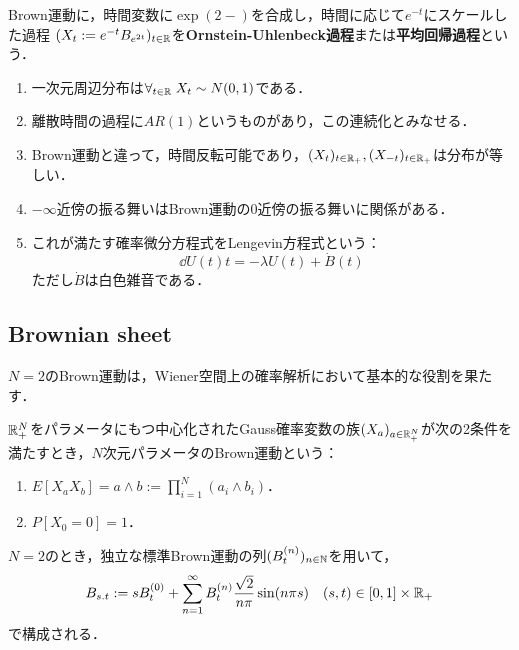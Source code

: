\documentclass[uplatex,dvipdfmx]{jsreport}
\begin{document}
\begin{definition}
    Brown運動に，時間変数に$\exp(2-)$を合成し，時間に応じて$e^{-t}$にスケールした過程
    $(X_t:=e^{-t}B_{e^{2t}})_{t\in\mathbb{R}}$を\textbf{Ornstein-Uhlenbeck過程}または\textbf{平均回帰過程}という．
\end{definition}
\begin{remarks}\mbox{}
    \begin{enumerate}
        \item 一次元周辺分布は$\forall_{t\in\mathbb{R}}\;X_t\sim N(0,1)$である．
        \item 離散時間の過程に$AR(1)$というものがあり，この連続化とみなせる．
        \item Brown運動と違って，時間反転可能であり，$(X_t)_{t\in\mathbb{R}_+},(X_{-t})_{t\in\mathbb{R}_+}$は分布が等しい．
        \item $-\infty$近傍の振る舞いはBrown運動の$0$近傍の振る舞いに関係がある．
        \item これが満たす確率微分方程式をLengevin方程式という：
        \[\dd{U(t)}{t}=-\lambda U(t)+\dot{B}(t)\]
        ただし$\dot{B}$は白色雑音である．
    \end{enumerate}
\end{remarks}



\subsection{Brownian sheet}

\begin{tcolorbox}[colframe=ForestGreen, colback=ForestGreen!10!white,breakable,colbacktitle=ForestGreen!40!white,coltitle=black,fonttitle=\bfseries\sffamily,
title=]
    $N=2$のBrown運動は，Wiener空間上の確率解析において基本的な役割を果たす．
\end{tcolorbox}

\begin{definition}
    $\mathbb{R}_+^N$をパラメータにもつ中心化されたGauss確率変数の族$(X_a)_{a\in\mathbb{R}_+^N}$が次の2条件を満たすとき，$N$次元パラメータのBrown運動という：
    \begin{enumerate}
        \item $E[X_aX_b]=a\land b:=\prod_{i=1}^N(a_i\land b_i)$．
        \item $P[X_0=0]=1$．
    \end{enumerate}
\end{definition}
\begin{proposition}
    $N=2$のとき，独立な標準Brown運動の列$(B_t^{(n)})_{n\in\mathbb{N}}$を用いて，
    \[B_{s.t}:=sB_t^{(0)}+\sum_{n=1}^\infty B_t^{(n)}\frac{\sqrt{2}}{n\pi}\sin(n\pi s)\quad(s,t)\in[0,1]\times\mathbb{R}_+\]
    で構成される．
\end{proposition}
\end{document}
